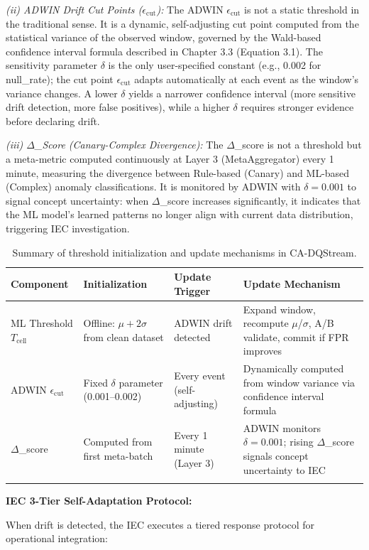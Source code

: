 \textit{(ii) ADWIN Drift Cut Points ($\epsilon_{\text{cut}}$):} The ADWIN $\epsilon_{\text{cut}}$ is not a static threshold in the traditional sense. It is a dynamic, self-adjusting cut point computed from the statistical variance of the observed window, governed by the Wald-based confidence interval formula described in Chapter 3.3 (Equation 3.1). The sensitivity parameter $\delta$ is the only user-specified constant (e.g., 0.002 for null\_rate); the cut point $\epsilon_{\text{cut}}$ adapts automatically at each event as the window's variance changes. A lower $\delta$ yields a narrower confidence interval (more sensitive drift detection, more false positives), while a higher $\delta$ requires stronger evidence before declaring drift.

\textit{(iii) $\Delta$\_Score (Canary-Complex Divergence):} The $\Delta$\_score is not a threshold but a meta-metric computed continuously at Layer 3 (MetaAggregator) every 1 minute, measuring the divergence between Rule-based (Canary) and ML-based (Complex) anomaly classifications. It is monitored by ADWIN with $\delta=0.001$ to signal concept uncertainty: when $\Delta$\_score increases significantly, it indicates that the ML model's learned patterns no longer align with current data distribution, triggering IEC investigation.

\begin{longtable}{|m{2.5cm}|m{3cm}|m{2cm}|m{5cm}|}
\hline
\textbf{Component} & \textbf{Initialization} & \textbf{Update Trigger} & \textbf{Update Mechanism} \\ \hline
ML Threshold $T_{\text{cell}}$ & Offline: $\mu+2\sigma$ from clean dataset & ADWIN drift detected & Expand window, recompute $\mu$/$\sigma$, A/B validate, commit if FPR improves \\ \hline
ADWIN $\epsilon_{\text{cut}}$ & Fixed $\delta$ parameter (0.001--0.002) & Every event (self-adjusting) & Dynamically computed from window variance via confidence interval formula \\ \hline
$\Delta$\_score & Computed from first meta-batch & Every 1 minute (Layer 3) & ADWIN monitors $\delta=0.001$; rising $\Delta$\_score signals concept uncertainty to IEC \\ \hline
\caption{Summary of threshold initialization and update mechanisms in CA-DQStream.}
\label{tab:threshold_lifecycle}
\end{longtable}

\textbf{IEC 3-Tier Self-Adaptation Protocol:}

When drift is detected, the IEC executes a tiered response protocol for operational integration:

